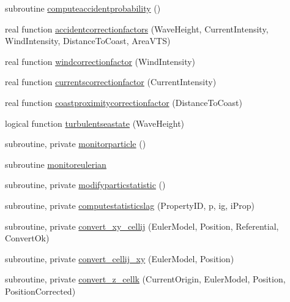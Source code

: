 \begin{DoxyCompactItemize}
\item 
subroutine \mbox{\hyperlink{namespacemodulelagrangianglobal_ab4d5d4f0cabe63a2e5fc1e9349f8425d}{computeaccidentprobability}} ()
\item 
real function \mbox{\hyperlink{namespacemodulelagrangianglobal_afb914f24bcc861691825610d67c3f53d}{accidentcorrectionfactors}} (Wave\+Height, Current\+Intensity, Wind\+Intensity, Distance\+To\+Coast, Area\+V\+TS)
\item 
real function \mbox{\hyperlink{namespacemodulelagrangianglobal_a69e5b3c9a0aabddfcaaf7e1b76623286}{windcorrectionfactor}} (Wind\+Intensity)
\item 
real function \mbox{\hyperlink{namespacemodulelagrangianglobal_ad3e36abc135e62fb5fb1583ea3acf79b}{currentscorrectionfactor}} (Current\+Intensity)
\item 
real function \mbox{\hyperlink{namespacemodulelagrangianglobal_a5ea7cad6f4171c5a773fbc1d09c57ebd}{coastproximitycorrectionfactor}} (Distance\+To\+Coast)
\item 
logical function \mbox{\hyperlink{namespacemodulelagrangianglobal_a66539afef33f6cbf3d95ac82710bc7f9}{turbulentseastate}} (Wave\+Height)
\item 
subroutine, private \mbox{\hyperlink{namespacemodulelagrangianglobal_a7e475a743774ea592904d34712f40255}{monitorparticle}} ()
\item 
subroutine \mbox{\hyperlink{namespacemodulelagrangianglobal_a6480946d4669725ebee110f6be9fba5b}{monitoreulerian}}
\item 
subroutine, private \mbox{\hyperlink{namespacemodulelagrangianglobal_a3039668c6b76c0fdde5ffdc19ebdfe88}{modifyparticstatistic}} ()
\item 
subroutine, private \mbox{\hyperlink{namespacemodulelagrangianglobal_a45258b52ee78ddc9c21fca279fad88da}{computestatisticslag}} (Property\+ID, p, ig, i\+Prop)
\item 
subroutine, private \mbox{\hyperlink{namespacemodulelagrangianglobal_a713100b692a8ced1a6b27a0a1baa4039}{convert\+\_\+xy\+\_\+cellij}} (Euler\+Model, Position, Referential, Convert\+Ok)
\item 
subroutine, private \mbox{\hyperlink{namespacemodulelagrangianglobal_a7c1bdff13dafe0f3f6c8cd12a1398401}{convert\+\_\+cellij\+\_\+xy}} (Euler\+Model, Position)
\item 
subroutine, private \mbox{\hyperlink{namespacemodulelagrangianglobal_a619a331b54dcc8d330ab6dd05b4eae56}{convert\+\_\+z\+\_\+cellk}} (Current\+Origin, Euler\+Model, Position, Position\+Corrected)
\item 

\end{DoxyCompactItemize}
